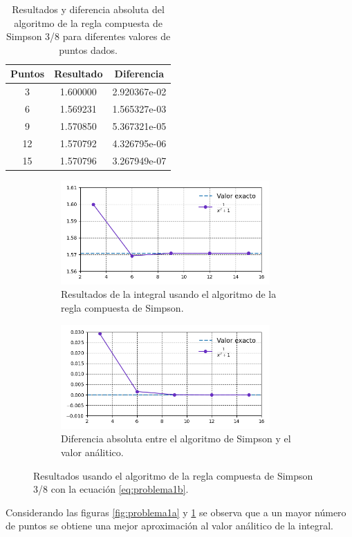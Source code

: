\begin{enumerate}
          \begin{table}[H]
              \centering
              \begin{tabular}{ccc} \hline
                  \textbf{Puntos} & \textbf{Resultado} & \textbf{Diferencia} \\ \hline
                  3               & 1.600000           & 2.920367e-02        \\
                  6               & 1.569231           & 1.565327e-03        \\
                  9               & 1.570850           & 5.367321e-05        \\
                  12              & 1.570792           & 4.326795e-06        \\
                  15              & 1.570796           & 3.267949e-07        \\ \hline
              \end{tabular}
              \caption{Resultados y diferencia absoluta del algoritmo de la regla compuesta de Simpson 3/8 para diferentes valores de puntos dados.}
              \label{table:problema1b}
          \end{table}

          \begin{figure}[H]
              \centering
              \begin{subfigure}[b]{8cm}
                  \includegraphics[width=8cm]{Graphics/problema01_fun_f2.png}
                  \caption{Resultados de la integral usando el algoritmo de la regla compuesta de Simpson.}
              \end{subfigure}
              \begin{subfigure}[b]{8cm}
                  \includegraphics[width=8cm]{Graphics/problema01_diff_f2.png}
                  \caption{Diferencia absoluta entre el algoritmo de Simpson y el valor análitico.}
              \end{subfigure}
              \caption{Resultados usando el algoritmo de la regla compuesta de Simpson 3/8 con la ecuación \ref{eq:problema1b}.}
              \label{fig:problema1b}
          \end{figure}
\end{enumerate}

Considerando las figuras \ref{fig:problema1a} y \ref{fig:problema1b} se observa que a un mayor número de puntos se obtiene una mejor aproximación al valor análitico de la integral.

